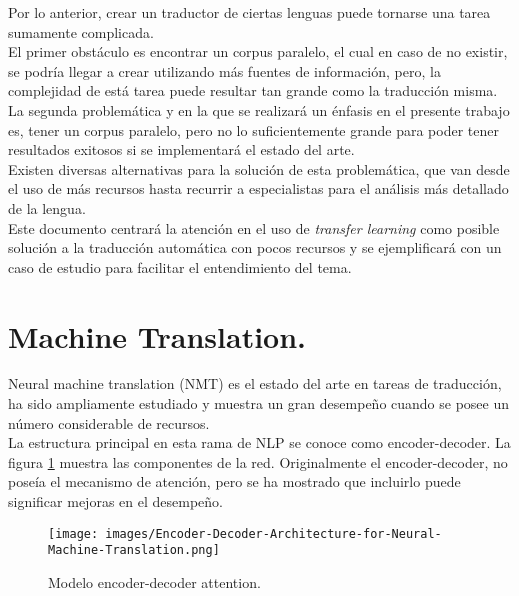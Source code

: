 \documentclass[12pt,twocolumn, letterpaper]{article}
\begin{document}
Por lo anterior, crear un traductor de ciertas lenguas puede tornarse una tarea sumamente complicada. \\

El primer obstáculo es encontrar un corpus paralelo, el cual en caso de no existir, se podría llegar a crear utilizando más fuentes de información, pero, la complejidad de está tarea puede resultar tan grande como la traducción misma.\\

La segunda problemática y en la que se realizará un énfasis en el presente trabajo es, tener un corpus paralelo, pero no lo suficientemente grande para poder tener resultados exitosos si se implementará el estado del arte.\\

Existen diversas alternativas para la solución de esta problemática, que van desde el uso de más recursos hasta recurrir a especialistas para el análisis más detallado de la lengua. \\

Este documento centrará la atención en el uso de \emph{transfer learning} como posible solución a la traducción automática con pocos recursos y se ejemplificará con un caso de estudio para facilitar el entendimiento del tema.

\section{Machine Translation.}
Neural machine translation (NMT) es el estado del arte en tareas de traducción, ha sido ampliamente estudiado y muestra un gran desempeño cuando se posee un número considerable de recursos.\\

La estructura principal en esta rama de NLP se conoce como encoder-decoder. La figura \ref{e-d} muestra las componentes de la red. Originalmente el encoder-decoder, no poseía el mecanismo de atención, pero se ha mostrado que incluirlo puede significar mejoras en el desempeño.

\begin{figure}[h]
\centering
\texttt{[image: images/Encoder-Decoder-Architecture-for-Neural-Machine-Translation.png]} 
\label{e-d}
\caption{Modelo encoder-decoder attention.}
\end{figure}
\end{document}

